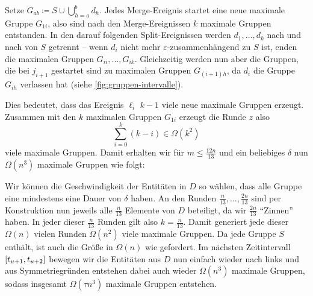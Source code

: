 \begin{beweis}
	Setze $G_{ab} \coloneqq S \cup \bigcup_{h=a}^b d_h$.
	Jedes Merge-Ereignis startet eine neue maximale Gruppe $G_{1i}$, also sind nach den Merge-Ereignissen $k$ maximale Gruppen entstanden.
	In den darauf folgenden Split-Ereignissen werden $d_1, \ldots , d_k$ nach und nach von $S$ getrennt -- wenn $d_i$ nicht mehr $\varepsilon$-zusammenhängend zu $S$ ist, enden die maximalen Gruppen $G_{ii}, \ldots , G_{ik}$.
	Gleichzeitig werden nun aber die Gruppen, die bei $j_{i+1}$ gestartet sind zu maximalen Gruppen $G_{(i+1)h}$, da $d_i$ die Gruppe $G_{ih}$ verlassen hat (siehe \cref{fig:gruppen-intervalle}).
	
	Dies bedeutet, dass das Ereignis $\ell_i$ $k-1$ viele neue maximale Gruppen erzeugt.
	Zusammen mit den $k$ maximalen Gruppen $G_{1i}$ erzeugt die Runde $z$ also
	\[
		\sum_{i=0}^{k} (k-i)  \in \Omega(k^2)
	\]
	viele maximale Gruppen.
	Damit erhalten wir für $m \le \frac{12n}{13}$ und ein beliebiges $\delta$ nun $\Omega(n^3)$ maximale Gruppen wie folgt:
	
	Wir können die Geschwindigkeit der Entitäten in $D$ so wählen, dass alle Gruppe eine mindestens eine Dauer von $\delta$ haben.
	An den Runden $\frac{n}{13}, \ldots , \frac{2n}{13}$ sind per Konstruktion nun jeweils alle $\frac{n}{13}$ Elemente von $D$ beteiligt, da wir $\frac{2n}{13}$ \enquote{Zinnen} haben.
	In jeder dieser $\frac{n}{13}$ Runden gilt also $k=\frac{n}{13}$.
	Damit generiert jede dieser $\Omega(n)$ vielen Runden $\Omega(n^2)$ viele maximale Gruppen.
	Da jede Gruppe $S$ enthält, ist auch die Größe in $\Omega(n)$ wie gefordert.
	Im nächsten Zeitintervall $\benbrace*{t_{u+1}, t_{u+2}}$ bewegen wir die Entitäten aus $D$ nun einfach wieder nach links und aus Symmetriegründen entstehen dabei auch wieder $\Omega(n^3)$ maximale Gruppen, sodass insgesamt $\Omega(\tau n^3)$ maximale Gruppen entstehen.
\end{beweis}

